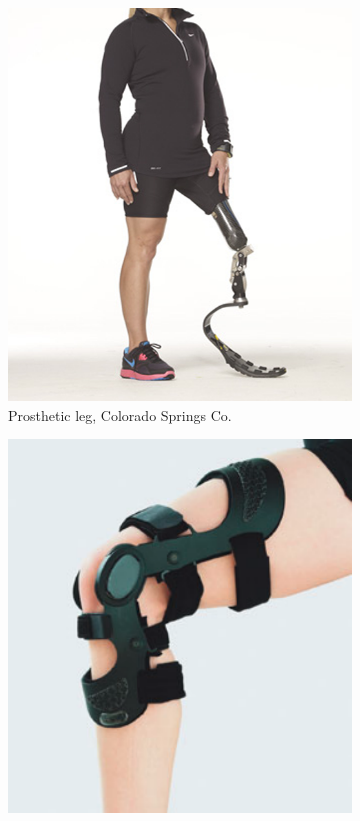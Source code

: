 \begin{figure}[h]
	\centering
    \begin{subfigure}[b]{0.3\textwidth}
        \includegraphics[width=\textwidth]{figures/prosthetic_leg.png}
        \caption{Prosthetic leg, Colorado Springs Co.}
        \label{fig:prosthetic_leg}
    \end{subfigure}
    \centering
    \begin{subfigure}[b]{0.3\textwidth}
        \includegraphics[width=\textwidth]{figures/orthotic_leg.pdf}

\end{subfigure}
\end{figure}
